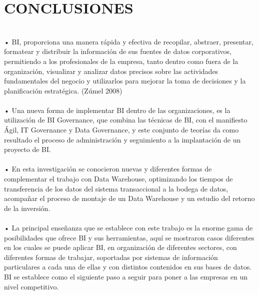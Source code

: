 \section{CONCLUSIONES} 
\begin{flushleft}
\textbf{}\\
• BI, proporciona una manera rápida y efectiva de recopilar, abstraer, presentar, formatear y distribuir la información de sus fuentes de datos corporativos, permitiendo a los profesionales de la empresa, tanto dentro como fuera de la organización, visualizar y analizar datos precisos sobre las actividades fundamentales del negocio y utilizarlos para mejorar la toma de decisiones y la planificación estratégica. (Zúmel 2008) \textbf{}\\
\textbf{}\\
• Una nueva forma de implementar BI dentro de las organizaciones, es la utilización de BI Governance, que combina las técnicas de BI, con el manifiesto Ágil, IT Governance y Data Governance, y este conjunto de teorías da como resultado el proceso de administración y seguimiento a la implantación de un proyecto de BI. \textbf{}\\
\textbf{}\\
• En esta investigación se conocieron nuevas y diferentes formas de complementar el trabajo con Data Warehouse, optimizando los tiempos de transferencia de los datos del sistema transaccional a la bodega de datos, acompañar el proceso de montaje de un Data Warehouse y un estudio del retorno de la inversión. \textbf{}\\
\textbf{}\\
• La principal enseñanza que se establece con este trabajo es la enorme gama de posibilidades que ofrece BI y sus herramientas, aquí se mostraron casos diferentes en los cuales se puede aplicar BI, en organización de diferentes sectores, con diferentes formas de trabajar, soportadas por sistemas de información particulares a cada una de ellas y con distintos contenidos en sus bases de datos. BI se establece como el siguiente paso a seguir para poner a las empresas en un nivel competitivo.\textbf{}\\


\textbf{}\\
\textbf{}\\
\textbf{}\\
\textbf{}\\
\textbf{}\\

\textbf{}\\
\textbf{}\\
\end{flushleft}